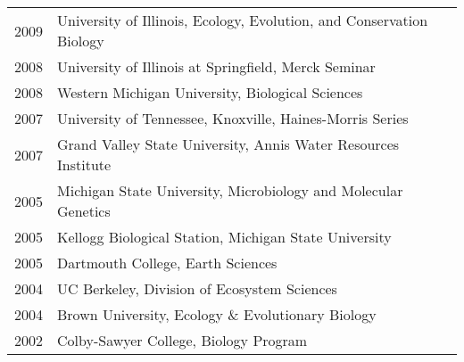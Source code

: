 \documentclass[11pt]{article}
\begin{document}
\begin{longtable}{@{}p{3em}@{\hspace{1.5em}}p{}@{}}
2009 & University of Illinois, Ecology, Evolution, and Conservation Biology \\
2008 & University of Illinois at Springfield, Merck Seminar \\
2008 & Western Michigan University, Biological Sciences \\
2007 & University of Tennessee, Knoxville, Haines-Morris Series \\
2007 & Grand Valley State University, Annis Water Resources Institute \\
2005 & Michigan State University, Microbiology and Molecular Genetics \\
2005 & Kellogg Biological Station, Michigan State University \\
2005 & Dartmouth College, Earth Sciences \\
2004 & UC Berkeley, Division of Ecosystem Sciences \\
2004 & Brown University, Ecology \& Evolutionary Biology \\
2002 & Colby-Sawyer College, Biology Program \\
\end{longtable}
\end{document}
